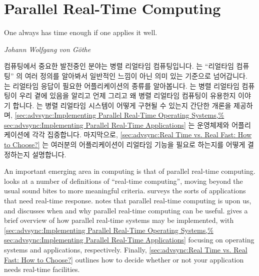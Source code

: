 
\section{Parallel Real-Time Computing}
\label{sec:advsync:Parallel Real-Time Computing}
%
\epigraph{One always has time enough if one applies it well.}
	 {\emph{Johann Wolfgang von G\"othe}}

컴퓨팅에서 중요한 발전중인 분야는 병렬 리얼타임 컴퓨팅입니다.
는 ``리얼타임 컴퓨팅'' 의 여러 정의를 알아봐서 일반적인 느낌이 아닌 의미 있는
기준으로 넘어갑니다.
는 리얼타임 응답이 필요한 어플리케이션의 종류를 알아봅니다.
는 병렬 리얼타임 컴퓨팅이 우리 곁에 있음을 알리고 언제 그리고 왜 병렬 리얼타임
컴퓨팅이 유용한지 이야기 합니다.
는 병렬 리얼타임 시스템이 어떻게 구현될 수 있는지 간단한 개론을 제공하며,
\cref{sec:advsync:Implementing Parallel Real-Time Operating Systems,%
sec:advsync:Implementing Parallel Real-Time Applications}
는 운영체제와 어플리케이션에 각각 집중합니다.
마지막으로,
\cref{sec:advsync:Real Time vs. Real Fast: How to Choose?}
는 여러분의 어플리케이션이 리얼타임 기능을 필요로 하는지를 어떻게 결정하는지
설명합니다.

\iffalse

An important emerging area in computing is that of parallel real-time
computing.
looks at a number of definitions of ``real-time computing'', moving
beyond the usual sound bites to more meaningful criteria.
surveys the sorts of applications that need real-time response.
notes that parallel real-time computing is upon us, and discusses
when and why parallel real-time computing can be useful.
gives a brief overview of how parallel real-time systems may be implemented,
with
\cref{sec:advsync:Implementing Parallel Real-Time Operating Systems,%
sec:advsync:Implementing Parallel Real-Time Applications}
focusing on operating systems and applications, respectively.
Finally,
\cref{sec:advsync:Real Time vs. Real Fast: How to Choose?}
outlines how to decide whether or not your application needs real-time
facilities.

